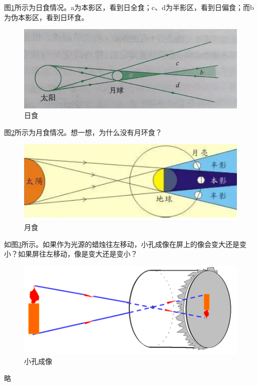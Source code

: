 \documentclass[windows,csize4, answers]{BHCexam}
\begin{document}
\begin{groups}
    图\ref{fig:fig_3_2}所示为日食情况。a为本影区，看到日全食；c、d为半影区，看到日偏食；而b为伪本影区，看到日环食。
    \begin{figure}[htb]
        \centering
        \includegraphics [scale=0.75,trim=0 0 0 0]{./image/fig_3_2.PNG}
        \caption{日食}
        \label{fig:fig_3_2}
    \end{figure}
    图\ref{fig:fig_3_3}所示为月食情况。想一想，为什么没有月环食？
    \begin{figure}[htb]
        \centering
        \includegraphics [scale=0.75,trim=0 0 0 0]{./image/fig_3_3.PNG}
        \caption{月食}
        \label{fig:fig_3_3}
    \end{figure}







    \begin{questions}[]
        \question[5]如图\ref{fig:fig_3_4}所示。如果作为光源的蜡烛往左移动，小孔成像在屏上的像会变大还是变小？如果屏往左移动，像是变大还是变小？
        \begin{figure}[htb]
            \centering
            \includegraphics [scale=0.75,trim=0 0 0 0]{./image/fig_3_4.PNG}
            \caption{小孔成像}
            \label{fig:fig_3_4}
        \end{figure}
        \begin{solution}{0.5cm}
            \methodonly 略 
        \end{solution}


\end{questions}
\end{groups}
\end{document}
